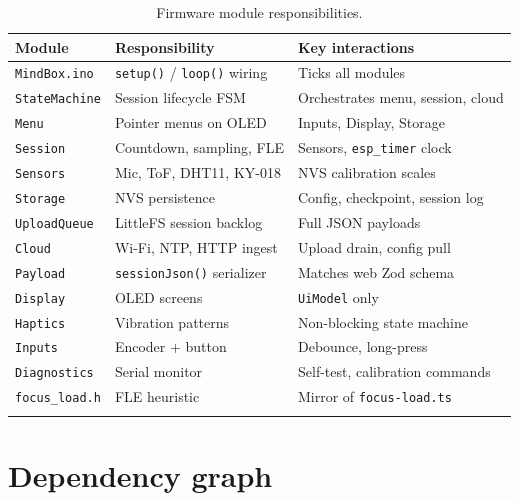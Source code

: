 \documentclass[11pt,a4paper]{report}
\newcommand{\filepath}[1]{\texttt{#1}}
\begin{document}
\begin{longtable}{@{}p{2.4cm}p{5.2cm}p{5.8cm}@{}}
\toprule
\textbf{Module} & \textbf{Responsibility} & \textbf{Key interactions} \\
\midrule
\endhead
\texttt{MindBox.ino} & \texttt{setup()} / \texttt{loop()} wiring & Ticks all modules \\
\texttt{StateMachine} & Session lifecycle FSM & Orchestrates menu, session, cloud \\
\texttt{Menu} & Pointer menus on OLED & Inputs, Display, Storage \\
\texttt{Session} & Countdown, sampling, FLE & Sensors, \texttt{esp\_timer} clock \\
\texttt{Sensors} & Mic, ToF, DHT11, KY-018 & NVS calibration scales \\
\texttt{Storage} & NVS persistence & Config, checkpoint, session log \\
\texttt{UploadQueue} & LittleFS session backlog & Full JSON payloads \\
\texttt{Cloud} & Wi-Fi, NTP, HTTP ingest & Upload drain, config pull \\
\texttt{Payload} & \texttt{sessionJson()} serializer & Matches web Zod schema \\
\texttt{Display} & OLED screens & \texttt{UiModel} only \\
\texttt{Haptics} & Vibration patterns & Non-blocking state machine \\
\texttt{Inputs} & Encoder + button & Debounce, long-press \\
\texttt{Diagnostics} & Serial monitor & Self-test, calibration commands \\
\texttt{focus\_load.h} & FLE heuristic & Mirror of \filepath{focus-load.ts} \\
\bottomrule
\caption{Firmware module responsibilities.}
\end{longtable}

\section{Dependency graph}
\end{document}
